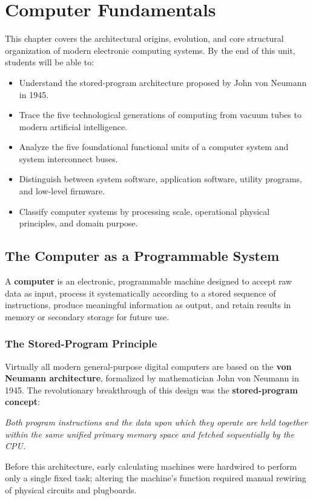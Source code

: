 \chapter{Computer Fundamentals}
\label{chap:computer_fundamentals}

\begin{tcolorbox}[enhanced, colback=boxnavybg, colframe=brandnavy, boxrule=1.2pt, arc=4pt, title={\Large\bfseries\sffamily Unit 2 Overview \& Learning Objectives}]
\sffamily\normalsize
This chapter covers the architectural origins, evolution, and core structural organization of modern electronic computing systems. By the end of this unit, students will be able to:
\begin{itemize}[leftmargin=1.2em, itemsep=2pt, topsep=3pt]
    \item Understand the stored-program architecture proposed by John von Neumann in 1945.
    \item Trace the five technological generations of computing from vacuum tubes to modern artificial intelligence.
    \item Analyze the five foundational functional units of a computer system and system interconnect buses.
    \item Distinguish between system software, application software, utility programs, and low-level firmware.
    \item Classify computer systems by processing scale, operational physical principles, and domain purpose.
\end{itemize}
\end{tcolorbox}

\section{The Computer as a Programmable System}

A \textbf{computer} is an electronic, programmable machine designed to accept raw data as input, process it systematically according to a stored sequence of instructions, produce meaningful information as output, and retain results in memory or secondary storage for future use.

\subsection{The Stored-Program Principle}
Virtually all modern general-purpose digital computers are based on the \textbf{von Neumann architecture}, formalized by mathematician John von Neumann in 1945. The revolutionary breakthrough of this design was the \textbf{stored-program concept}:
\begin{center}
\textit{Both program instructions and the data upon which they operate are held together within the same unified primary memory space and fetched sequentially by the CPU.}
\end{center}
Before this architecture, early calculating machines were hardwired to perform only a single fixed task; altering the machine's function required manual rewiring of physical circuits and plugboards.

